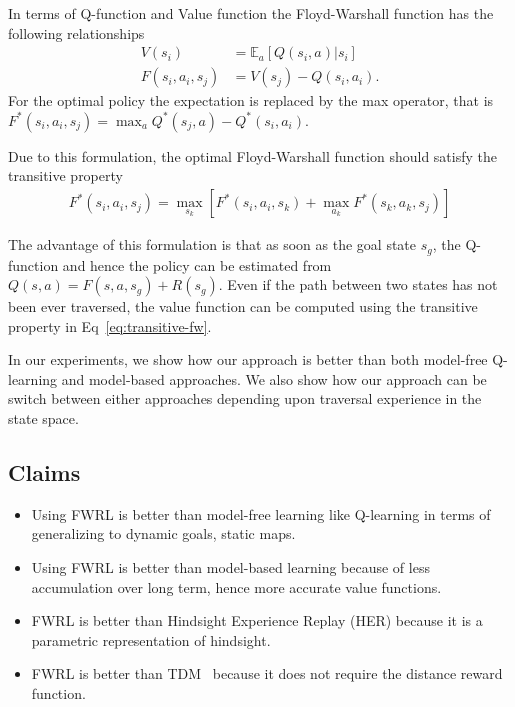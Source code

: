\documentclass[letterpaper]{article} %
\def\state{s}
\def\act{a}
\def\Rew{R}
\def\E{\mathbb{E}}
\begin{document}
In terms of Q-function and Value function the Floyd-Warshall function has the following relationships
\begin{align}
V(\state_i) &= \E_{\act}[Q(\state_i, \act)|\state_i] \\
F(\state_i, \act_i, \state_j) &= V(\state_j) - Q(\state_i, \act_i).
\end{align}
For the optimal policy the expectation is replaced by the max operator, that is $F^*(\state_i, \act_i, \state_j) = \max_{\act} Q^*(\state_j, \act) - Q^*(\state_i, \act_i)$.

Due to this formulation, the optimal Floyd-Warshall function should satisfy the transitive property
\begin{align}
F^*(\state_i, \act_i, \state_j) = \max_{\state_k} \left[ F^*(\state_i, \act_i, \state_k)
+ \max_{\act_k}F^*(\state_k, \act_k, \state_j) \right]
\label{eq:transitive-fw}
\end{align}

The advantage of this formulation is that as soon as the goal state $\state_g$, the Q-function and
hence the policy can be estimated from $Q(\state, \act) = F(\state, \act, \state_g) + \Rew(\state_g)$.
Even if the path between two states has not been ever traversed, the value function
can be computed using the transitive property in Eq~\ref{eq:transitive-fw}. 

In our experiments, we show how our approach is better than both model-free Q-learning and model-based approaches. We also show how our approach can be switch between either approaches depending upon traversal experience in the state space.

\subsection{Claims}
\begin{itemize} \item
Using FWRL is better than model-free learning like Q-learning in terms of generalizing to dynamic goals, static maps.
\item 
Using FWRL is better than model-based learning because of less accumulation over long term, hence more accurate value functions.
\item FWRL is better than Hindsight Experience Replay (HER) \cite{andrychowicz2016learning} because it is a parametric representation of hindsight.
\item FWRL is better than TDM~\cite{pong2018temporal} because it does not require the distance reward function.
\end{itemize}
\end{document}
